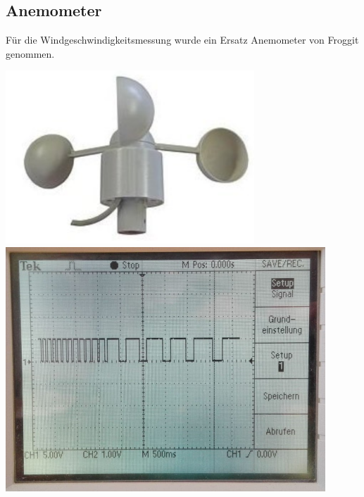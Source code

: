 \subsection{Anemometer}
\begin{minipage}{0.5\textwidth}
Für die Windgeschwindigkeitsmessung wurde ein Ersatz Anemometer von Froggit genommen.
\end{minipage}
\begin{minipage}{0.49\textwidth}
\centering
\includegraphics[width=0.7\textwidth]{graphics/Anemometer/anemometer.png}
\label{fig:anemometer}
\vspace{0.5cm}
\includegraphics[width = 0.9\textwidth]{graphics/Anemometer/oszilloskop_anenometer_puls.png}
\label{fig:rechteckpuls_anemometer}
\end{minipage}

